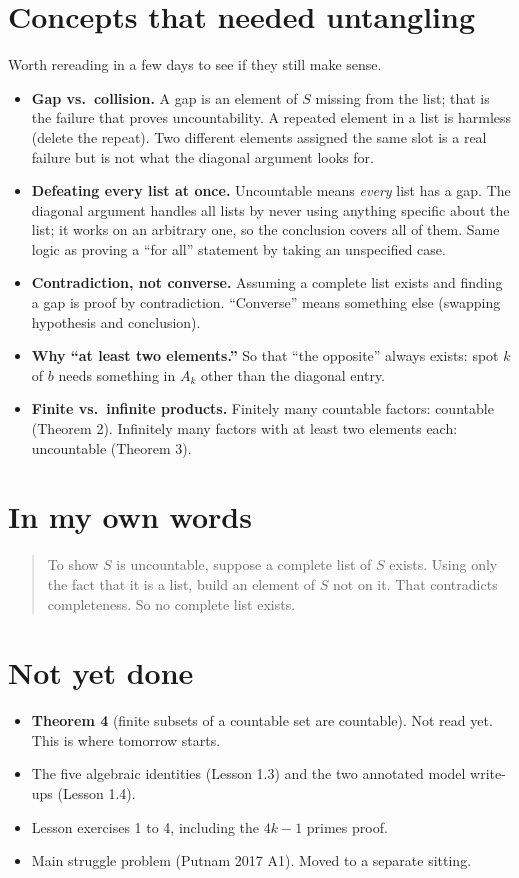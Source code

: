 \documentclass[11pt]{article}
\begin{document}
\section*{Concepts that needed untangling}
Worth rereading in a few days to see if they still make sense.
\begin{itemize}
  \item \textbf{Gap vs.\ collision.} A gap is an element of $S$ missing from the list; that is the failure that proves uncountability. A repeated element in a list is harmless (delete the repeat). Two different elements assigned the same slot is a real failure but is not what the diagonal argument looks for.
  \item \textbf{Defeating every list at once.} Uncountable means \emph{every} list has a gap. The diagonal argument handles all lists by never using anything specific about the list; it works on an arbitrary one, so the conclusion covers all of them. Same logic as proving a ``for all'' statement by taking an unspecified case.
  \item \textbf{Contradiction, not converse.} Assuming a complete list exists and finding a gap is proof by contradiction. ``Converse'' means something else (swapping hypothesis and conclusion).
  \item \textbf{Why ``at least two elements.''} So that ``the opposite'' always exists: spot $k$ of $b$ needs something in $A_k$ other than the diagonal entry.
  \item \textbf{Finite vs.\ infinite products.} Finitely many countable factors: countable (Theorem 2). Infinitely many factors with at least two elements each: uncountable (Theorem 3).
\end{itemize}

\section*{In my own words}
\begin{quote}
To show $S$ is uncountable, suppose a complete list of $S$ exists. Using only the fact that it is a list, build an element of $S$ not on it. That contradicts completeness. So no complete list exists.
\end{quote}

\section*{Not yet done}
\begin{itemize}
  \item \textbf{Theorem 4} (finite subsets of a countable set are countable). Not read yet. This is where tomorrow starts.
  \item The five algebraic identities (Lesson 1.3) and the two annotated model write-ups (Lesson 1.4).
  \item Lesson exercises 1 to 4, including the $4k-1$ primes proof.
  \item Main struggle problem (Putnam 2017 A1). Moved to a separate sitting.
\end{itemize}
\end{document}
